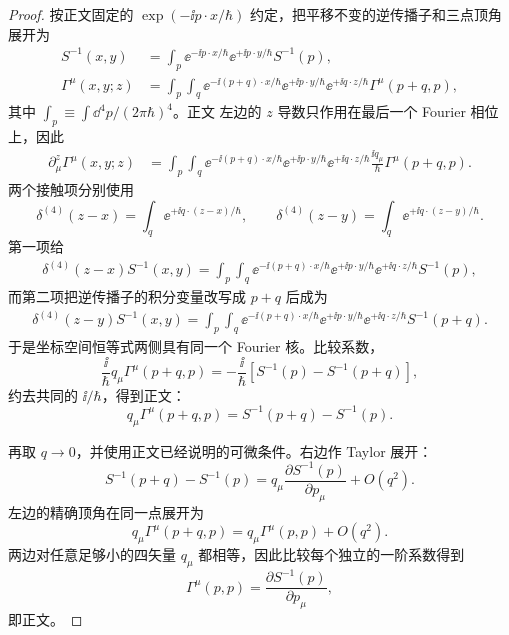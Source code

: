 \begin{proof}
按正文固定的 $\exp(-\ii p\cdot x/\hbar)$ 约定，把平移不变的逆传播子和三点顶角展开为
\begin{align*}
S^{-1}(x,y)
&=\int_p
 \ee^{-\ii p\cdot x/\hbar}
 \ee^{+\ii p\cdot y/\hbar}S^{-1}(p),\\
\Gamma^\mu(x,y;z)
&=\int_p\!\int_q
 \ee^{-\ii(p+q)\cdot x/\hbar}
 \ee^{+\ii p\cdot y/\hbar}
 \ee^{+\ii q\cdot z/\hbar}
 \Gamma^\mu(p+q,p),
\end{align*}
其中 $\int_p\equiv\int \dd^4 p/(2\pi\hbar)^4$。正文 左边的 $z$ 导数只作用在最后一个 Fourier 相位上，因此
\begin{align*}
\partial_\mu^z\Gamma^\mu(x,y;z)
&=\int_p\!\int_q
 \ee^{-\ii(p+q)\cdot x/\hbar}
 \ee^{+\ii p\cdot y/\hbar}
 \ee^{+\ii q\cdot z/\hbar}
 \frac{\ii q_\mu}{\hbar}
 \Gamma^\mu(p+q,p).
\end{align*}
两个接触项分别使用
\begin{equation*}
\delta^{(4)}(z-x)=\int_q\ee^{+\ii q\cdot(z-x)/\hbar},
\qquad
\delta^{(4)}(z-y)=\int_q\ee^{+\ii q\cdot(z-y)/\hbar}.
\end{equation*}
第一项给
\begin{align*}
\delta^{(4)}(z-x)S^{-1}(x,y)
=\int_p\!\int_q
 \ee^{-\ii(p+q)\cdot x/\hbar}
 \ee^{+\ii p\cdot y/\hbar}
 \ee^{+\ii q\cdot z/\hbar}S^{-1}(p),
\end{align*}
而第二项把逆传播子的积分变量改写成 $p+q$ 后成为
\begin{align*}
\delta^{(4)}(z-y)S^{-1}(x,y)
=\int_p\!\int_q
 \ee^{-\ii(p+q)\cdot x/\hbar}
 \ee^{+\ii p\cdot y/\hbar}
 \ee^{+\ii q\cdot z/\hbar}S^{-1}(p+q).
\end{align*}
于是坐标空间恒等式两侧具有同一个 Fourier 核。比较系数，
\begin{equation*}
\frac{\ii}{\hbar}q_\mu\Gamma^\mu(p+q,p)
=-\frac{\ii}{\hbar}\left[S^{-1}(p)-S^{-1}(p+q)\right],
\end{equation*}
约去共同的 $\ii/\hbar$，得到正文：
\begin{equation*}
 q_\mu\Gamma^\mu(p+q,p)
 =S^{-1}(p+q)-S^{-1}(p).
\end{equation*}

再取 $q\to0$，并使用正文已经说明的可微条件。右边作 Taylor 展开：
\begin{equation*}
 S^{-1}(p+q)-S^{-1}(p)
 =q_\mu\frac{\partial S^{-1}(p)}{\partial p_\mu}+O(q^2).
\end{equation*}
左边的精确顶角在同一点展开为
\begin{equation*}
 q_\mu\Gamma^\mu(p+q,p)
 =q_\mu\Gamma^\mu(p,p)+O(q^2).
\end{equation*}
两边对任意足够小的四矢量 $q_\mu$ 都相等，因此比较每个独立的一阶系数得到
\begin{equation*}
 \Gamma^\mu(p,p)=\frac{\partial S^{-1}(p)}{\partial p_\mu},
\end{equation*}
即正文。
\end{proof}

